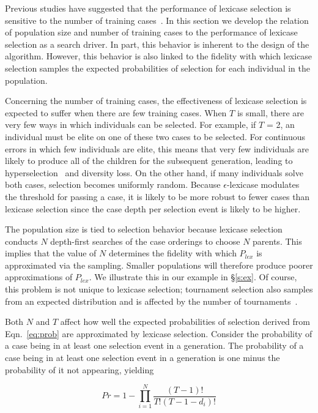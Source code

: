 \documentclass[twoside]{article}
\begin{document}
Previous studies have suggested that the performance of lexicase selection is sensitive to the number of training cases~\citep{liskowski_comparison_2015}. In this section we develop the relation of population size and number of training cases to the performance of lexicase selection as a search driver. In part, this behavior is inherent to the design of the algorithm. However, this behavior is also linked to the fidelity with which lexicase selection samples the expected probabilities of selection for each individual in the population. 

Concerning the number of training cases, the effectiveness of lexicase selection is expected to suffer when there are few training cases. When $T$ is small, there are very few ways in which individuals can be selected. For example, if $T$ = 2, an individual must be elite on one of these two cases to be selected. For continuous errors in which few individuals are elite, this means that very few individuals are likely to produce all of the children for the subsequent generation, leading to hyperselection~\citep{helmuth_impact_2016} and diversity loss. On the other hand, if many individuals solve both cases, selection becomes uniformly random. Because $\epsilon$-lexicase modulates the threshold for passing a case, it is likely to be more robust to fewer cases than lexicase selection since the case depth per selection event is likely to be higher.

The population size is tied to selection behavior because lexicase selection conducts $N$ depth-first searches of the case orderings to choose $N$ parents. This implies that the value of $N$ determines the fidelity with which $P_{lex}$ is approximated via the sampling. Smaller populations will therefore produce poorer approximations of $P_{lex}$. We illustrate this in our example in \S\ref{s:ex}. Of course, this problem is not unique to lexicase selection; tournament selection also samples from an expected distribution and is affected by the number of tournaments~\citep{xie_another_2007}.  

Both $N$ and $T$ affect how well the expected probabilities of selection derived from Eqn.~\ref{eq:prob} are approximated by lexicase selection. Consider the probability of a case being in at least one selection event in a generation. The probability of a case being in at least one selection event in a generation is one minus the probability of it not appearing, yielding


\[Pr= 1 - \prod_{i=1}^N{\frac{(T-1)!}{T!(T-1-d_i)!}} \]
\end{document}
